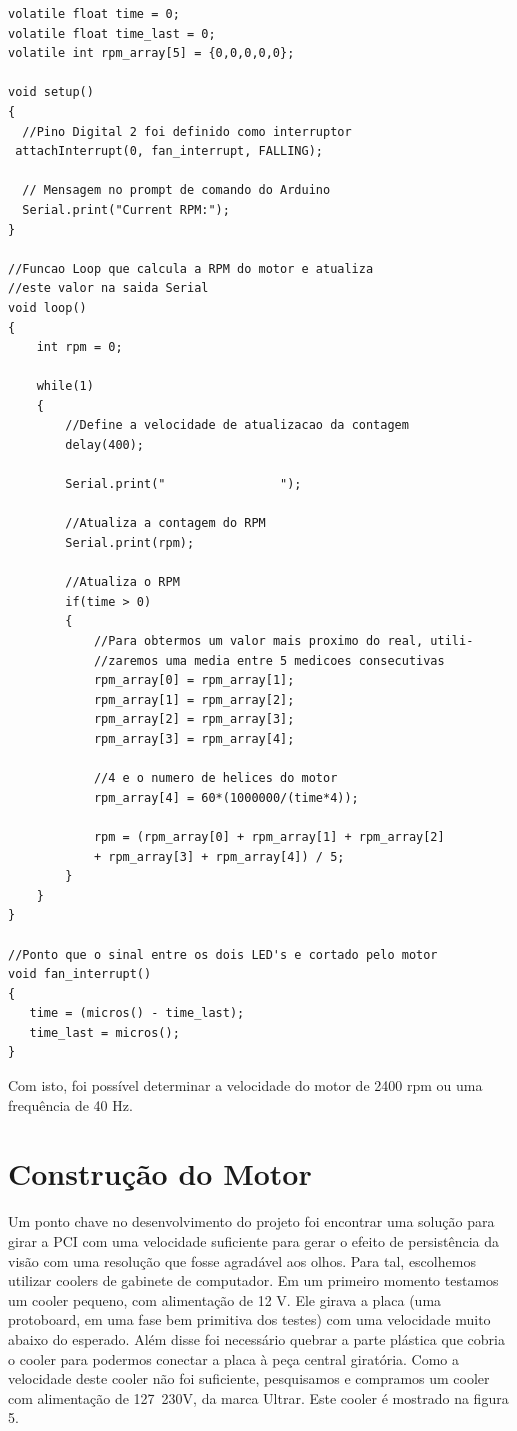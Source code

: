\begin{lstlisting}
volatile float time = 0;
volatile float time_last = 0;
volatile int rpm_array[5] = {0,0,0,0,0};

void setup()
{
  //Pino Digital 2 foi definido como interruptor
 attachInterrupt(0, fan_interrupt, FALLING);

  // Mensagem no prompt de comando do Arduino
  Serial.print("Current RPM:");
}

//Funcao Loop que calcula a RPM do motor e atualiza
//este valor na saida Serial
void loop()
{
    int rpm = 0;

    while(1)
    {
        //Define a velocidade de atualizacao da contagem
        delay(400);

        Serial.print("                ");

        //Atualiza a contagem do RPM
        Serial.print(rpm);

        //Atualiza o RPM
        if(time > 0)
        {
            //Para obtermos um valor mais proximo do real, utili-
            //zaremos uma media entre 5 medicoes consecutivas
            rpm_array[0] = rpm_array[1];
            rpm_array[1] = rpm_array[2];
            rpm_array[2] = rpm_array[3];
            rpm_array[3] = rpm_array[4];

            //4 e o numero de helices do motor
            rpm_array[4] = 60*(1000000/(time*4));

            rpm = (rpm_array[0] + rpm_array[1] + rpm_array[2]
            + rpm_array[3] + rpm_array[4]) / 5;
        }
    }
}

//Ponto que o sinal entre os dois LED's e cortado pelo motor
void fan_interrupt()
{
   time = (micros() - time_last);
   time_last = micros();
}
\end{lstlisting}

Com isto, foi possível determinar a velocidade do motor de 2400 rpm ou uma frequência de 40 Hz.

\section{Construção do Motor}
Um ponto chave no desenvolvimento do projeto foi encontrar uma solução para girar a PCI com uma velocidade suficiente para gerar o efeito de persistência da visão com uma resolução que fosse agradável aos olhos.
Para tal, escolhemos utilizar coolers de gabinete de computador. Em um primeiro momento testamos um cooler pequeno, com alimentação de 12 V. Ele girava a placa (uma protoboard, em uma fase bem primitiva dos testes) com uma velocidade muito abaixo do esperado. Além disse foi necessário quebrar a parte plástica que cobria o cooler para podermos conectar a placa à peça central giratória.
Como a velocidade deste cooler não foi suficiente, pesquisamos e compramos um cooler com alimentação de 127~230V, da marca Ultrar. Este cooler é mostrado na figura 5.

